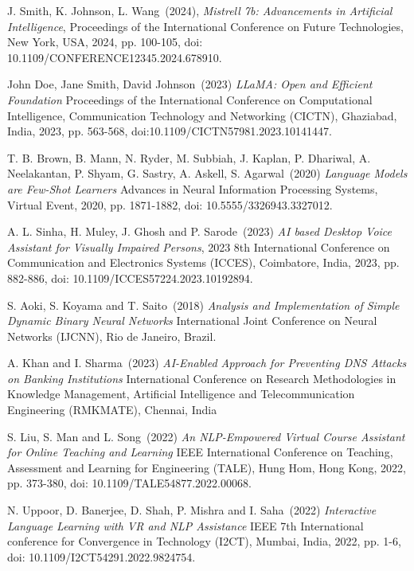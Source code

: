 \begin{thebibliography}{999}

J. Smith, K. Johnson, L. Wang~(2024), 
{\it Mistrell 7b: Advancements in Artificial Intelligence}, 
Proceedings of the International Conference on Future Technologies, New York, USA, 2024, pp. 100-105, doi: 10.1109/CONFERENCE12345.2024.678910.


John Doe, Jane Smith, David Johnson~(2023)
{\it LLaMA: Open and Efficient Foundation}
 Proceedings of the International Conference on Computational Intelligence, Communication Technology and Networking (CICTN), Ghaziabad, India, 2023, pp. 563-568, doi:10.1109/CICTN57981.2023.10141447.


T. B. Brown, B. Mann, N. Ryder, M. Subbiah, J. Kaplan, P. Dhariwal, A. Neelakantan, P. Shyam, G. Sastry, A. Askell, S. Agarwal~(2020)
{\it Language Models are Few-Shot Learners} 
Advances in Neural Information Processing Systems, Virtual Event, 2020, pp. 1871-1882, doi: 10.5555/3326943.3327012.


A. L. Sinha, H. Muley, J. Ghosh and P. Sarode~(2023) 
{\it AI based Desktop Voice Assistant for Visually Impaired Persons}, 
 2023 8th International Conference on Communication and Electronics Systems (ICCES), Coimbatore, India, 2023,  pp. 882-886, doi: 10.1109/ICCES57224.2023.10192894.



S. Aoki, S. Koyama and T. Saito~(2018)
{\it Analysis and Implementation of Simple Dynamic Binary Neural Networks} 
International Joint Conference on Neural Networks (IJCNN), Rio de Janeiro, Brazil.

A. Khan and I. Sharma~(2023)
{\it AI-Enabled Approach for Preventing DNS Attacks on Banking Institutions}
International Conference on Research Methodologies in Knowledge Management, Artificial Intelligence and Telecommunication Engineering (RMKMATE), Chennai, India

\clearpage

S. Liu, S. Man and L. Song~(2022)
{\it An NLP-Empowered Virtual Course Assistant for Online Teaching and Learning} 
 IEEE International Conference on Teaching, Assessment and Learning for Engineering (TALE), Hung Hom, Hong Kong, 2022, pp. 373-380, doi: 10.1109/TALE54877.2022.00068.


N. Uppoor, D. Banerjee, D. Shah, P. Mishra and I. Saha~(2022)
{\it Interactive Language Learning with VR and NLP Assistance}
IEEE 7th International conference for Convergence in Technology (I2CT), Mumbai, India, 2022, pp. 1-6, doi: 10.1109/I2CT54291.2022.9824754.



\end{thebibliography}
